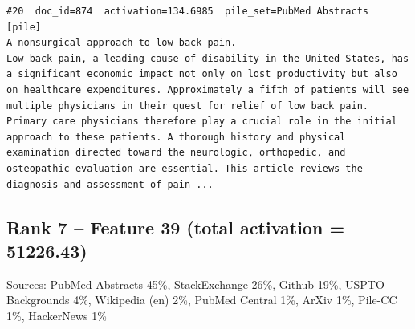 \begin{verbatim}
#20  doc_id=874  activation=134.6985  pile_set=PubMed Abstracts  [pile]
A nonsurgical approach to low back pain.
Low back pain, a leading cause of disability in the United States, has a significant economic impact not only on lost productivity but also on healthcare expenditures. Approximately a fifth of patients will see multiple physicians in their quest for relief of low back pain. Primary care physicians therefore play a crucial role in the initial approach to these patients. A thorough history and physical examination directed toward the neurologic, orthopedic, and osteopathic evaluation are essential. This article reviews the diagnosis and assessment of pain ...

\end{verbatim}

\subsection*{Rank 7 -- Feature 39 (total activation = 51226.43)}

Sources: PubMed Abstracts 45\%, StackExchange 26\%, Github 19\%, USPTO Backgrounds 4\%, Wikipedia (en) 2\%, PubMed Central 1\%, ArXiv 1\%, Pile-CC 1\%, HackerNews 1\%

